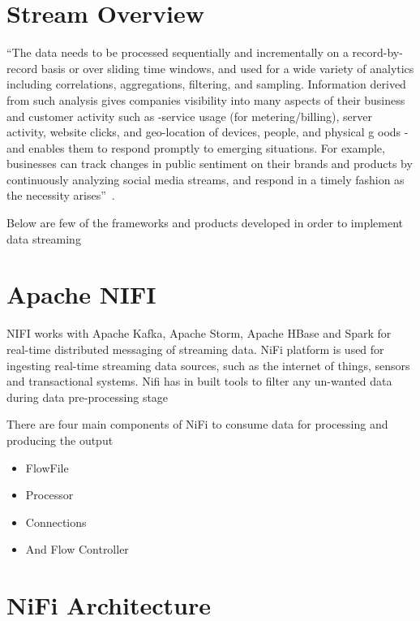 \section{Stream Overview}

``The data needs to be processed sequentially and incrementally on a
record-by-record basis or over sliding time windows, and used for a
wide variety of analytics including correlations, aggregations,
filtering, and sampling.  Information derived from such analysis gives
companies visibility into many aspects of their business and customer
activity such as -service usage (for metering/billing), server
activity, website clicks, and geo-location of devices, people, and
physical g oods -and enables them to respond promptly to emerging
situations. For example, businesses can track changes in public
sentiment on their brands and products by continuously analyzing
social media streams, and respond in a timely fashion as the necessity
arises''~\cite{hid-sp18-514-bigdata-stream-overview}.
 
Below are few of the frameworks and products developed in order to
implement data streaming
 
\section{Apache NIFI}
 
NIFI works with Apache Kafka, Apache Storm, Apache HBase and Spark for
real-time distributed messaging of streaming data.  NiFi platform is
used for ingesting real-time streaming data sources, such as the
internet of things, sensors and transactional systems. Nifi has in
built tools to filter any un-wanted data during data pre-processing
stage

There are four main components of NiFi to consume data for processing
and producing the output
 
\begin{itemize}
\item FlowFile
\item Processor
\item Connections
\item And Flow Controller
\end{itemize}
 
\section{NiFi Architecture}

